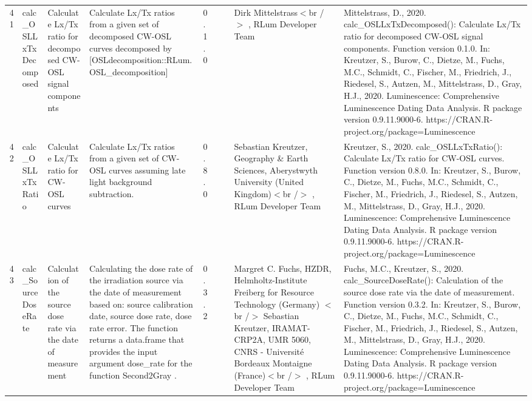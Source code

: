 \begin{table}[ht]
\begin{tabular}{rllllllll}
 \\ 
  41 & calc\_OSLLxTxDecomposed & Calculate Lx/Tx ratio for decomposed CW-OSL signal components & Calculate  Lx/Tx  ratios from a given set of decomposed CW-OSL curves decomposed by  [OSLdecomposition::RLum.OSL\_decomposition] & 0.1.0
 &  &  & Dirk Mittelstrass$<$br /$>$ , RLum Developer Team & Mittelstrass, D., 2020. calc\_OSLLxTxDecomposed(): Calculate Lx/Tx ratio for decomposed CW-OSL signal components. Function version 0.1.0. In: Kreutzer, S., Burow, C., Dietze, M., Fuchs, M.C., Schmidt, C., Fischer, M., Friedrich, J., Riedesel, S., Autzen, M., Mittelstrass, D., Gray, H.J., 2020. Luminescence: Comprehensive Luminescence Dating Data Analysis. R package version 0.9.11.9000-6. https://CRAN.R-project.org/package=Luminescence
 \\ 
  42 & calc\_OSLLxTxRatio & Calculate  Lx/Tx  ratio for CW-OSL curves & Calculate  Lx/Tx  ratios from a given set of CW-OSL curves assuming late light background subtraction. & 0.8.0
 &  &  & Sebastian Kreutzer, Geography \& Earth Sciences, Aberystwyth University (United Kingdom)$<$br /$>$ , RLum Developer Team & Kreutzer, S., 2020. calc\_OSLLxTxRatio(): Calculate Lx/Tx ratio for CW-OSL curves. Function version 0.8.0. In: Kreutzer, S., Burow, C., Dietze, M., Fuchs, M.C., Schmidt, C., Fischer, M., Friedrich, J., Riedesel, S., Autzen, M., Mittelstrass, D., Gray, H.J., 2020. Luminescence: Comprehensive Luminescence Dating Data Analysis. R package version 0.9.11.9000-6. https://CRAN.R-project.org/package=Luminescence
 \\ 
  43 & calc\_SourceDoseRate & Calculation of the source dose rate via the date of measurement & Calculating the dose rate of the irradiation source via the date of measurement based on: source calibration date, source dose rate, dose rate error. The function returns a data.frame that provides the input argument dose\_rate for the function  Second2Gray . & 0.3.2
 &  &  & Margret C. Fuchs, HZDR, Helmholtz-Institute Freiberg for Resource Technology (Germany)  $<$br /$>$ Sebastian Kreutzer, IRAMAT-CRP2A, UMR 5060, CNRS - Université Bordeaux Montaigne (France)$<$br /$>$ , RLum Developer Team & Fuchs, M.C., Kreutzer, S., 2020. calc\_SourceDoseRate(): Calculation of the source dose rate via the date of measurement. Function version 0.3.2. In: Kreutzer, S., Burow, C., Dietze, M., Fuchs, M.C., Schmidt, C., Fischer, M., Friedrich, J., Riedesel, S., Autzen, M., Mittelstrass, D., Gray, H.J., 2020. Luminescence: Comprehensive Luminescence Dating Data Analysis. R package version 0.9.11.9000-6. https://CRAN.R-project.org/package=Luminescence

\end{tabular}
\end{table}
